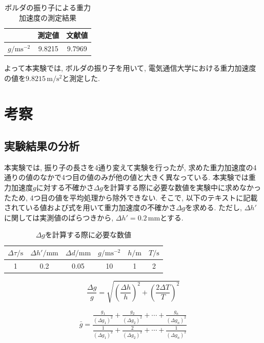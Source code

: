 \documentclass{jarticle}
\begin{document}
\begin{table}[h]
  \centering
  \caption{ボルダの振り子による重力加速度の測定結果}
  \begin{tabular}{ccc}
    \hline
    & 測定値 & 文献値 \\
    \hline
    $g/\mathrm{ms^{-2}}$ & 9.8215 & 9.7969 \\
    \hline
  \end{tabular}
\end{table}

よって本実験では, ボルダの振り子を用いて, 電気通信大学における重力加速度の値を$9.8215\,\mathrm{m/s^2}$と測定した.


\section{考察}


\subsection{実験結果の分析}

本実験では, 振り子の長さを4通り変えて実験を行ったが, 求めた重力加速度の4通りの値のなかで4つ目の値のみが他の値と大きく異なっている.
本実験では重力加速度$g$に対する不確かさ$\Delta g$を計算する際に必要な数値を実験中に求めなかったため, 4つ目の値を平均処理から除外できない.
そこで, 以下のテキストに記載されている値および式を用いて重力加速度の不確かさ$\Delta g$を求める. ただし, $\Delta h'$に関しては実測値のばらつきから, $\Delta h'=0.2\,\mathrm{mm}$とする.

\begin{table}[h]
  \centering
  \caption{$\Delta g$を計算する際に必要な数値}
  \begin{tabular}{cccccc}
    \hline
    $\Delta\tau/\mathrm{s}$ & $\Delta h'/\mathrm{mm}$ & $\Delta d/\mathrm{mm}$ & $g/\mathrm{ms^{-2}}$ & $h/\mathrm{m}$ & $T/\mathrm{s}$ \\
    \hline
    1 & 0.2 & 0.05 & 10 & 1 & 2 \\
    \hline
  \end{tabular}
\end{table}


\begin{equation}
  \frac{\Delta g}{g}=\sqrt{\left(\frac{\Delta h}{h}\right)^2+\left(\frac{2\Delta T}{T}\right)^2}
\end{equation}

\begin{equation}
  \bar{g}=\frac{
    \frac{g_1}{(\Delta g_1)^2} + \frac{g_2}{(\Delta g_2)^2}+\cdots+\frac{g_n}{(\Delta g_n)^2}
  }{
    \frac{1}{(\Delta g_1)^2} + \frac{2}{(\Delta g_2)^2}+\cdots+\frac{1}{(\Delta g_n)^2}
  }
\end{equation}
\end{document}
